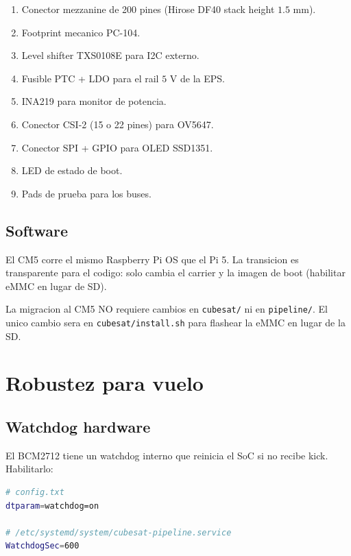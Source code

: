 \documentclass[11pt,a4paper,oneside]{report}
\begin{document}
\begin{enumerate}[leftmargin=2em]
  \item Conector mezzanine de 200 pines (Hirose DF40 stack height $1.5$ mm).
  \item Footprint mecanico PC-104.
  \item Level shifter TXS0108E para I2C externo.
  \item Fusible PTC + LDO para el rail $5$ V de la EPS.
  \item INA219 para monitor de potencia.
  \item Conector CSI-2 (15 o 22 pines) para OV5647.
  \item Conector SPI + GPIO para OLED SSD1351.
  \item LED de estado de boot.
  \item Pads de prueba para los buses.
\end{enumerate}

\section{Software}

El CM5 corre el mismo Raspberry Pi OS que el Pi 5. La transicion es
transparente para el codigo: solo cambia el carrier y la imagen de boot
(habilitar eMMC en lugar de SD).

\begin{nota}
La migracion al CM5 NO requiere cambios en \texttt{cubesat/} ni en
\texttt{pipeline/}. El unico cambio sera en \texttt{cubesat/install.sh}
para flashear la eMMC en lugar de la SD.
\end{nota}

\chapter{Robustez para vuelo}

\section{Watchdog hardware}

El BCM2712 tiene un watchdog interno que reinicia el SoC si no recibe kick.
Habilitarlo:

\begin{lstlisting}[language=bash]
# config.txt
dtparam=watchdog=on

# /etc/systemd/system/cubesat-pipeline.service
WatchdogSec=600
\end{lstlisting}
\end{document}

